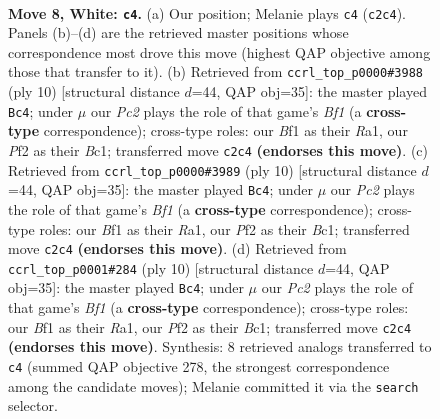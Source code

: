 \documentclass[11pt]{article}
\begin{document}
\begin{figure}[p]\centering
\begin{subfigure}{0.46\textwidth}\centering
\resizebox{\linewidth}{!}{%
\newchessgame
\chessboard[
  setfen={r1b1kbnr/p1ppqppp/2p5/4P3/8/8/PPP1QPPP/RNB1KB1R w KQkq - 3 8},
  showmover=false,
  pgfstyle=straightmove, color=movearrow, markmove={c2-c4}
]}
\caption{}
\end{subfigure}\hfill
\begin{subfigure}{0.46\textwidth}\centering
\resizebox{\linewidth}{!}{%
\newchessgame
\chessboard[
  setfen={rnbqkb1r/pp3ppp/2p2p2/8/3P4/8/PPP2PPP/R1BQKBNR w KQkq - 0 6},
  showmover=false,
  pgfstyle=straightmove, color=movearrow, markmove={f1-c4}
]}
\caption{}
\end{subfigure}
\\[4pt]
\begin{subfigure}{0.46\textwidth}\centering
\resizebox{\linewidth}{!}{%
\newchessgame
\chessboard[
  setfen={rnbqkb1r/pp3ppp/2p2p2/8/3P4/8/PPP2PPP/R1BQKBNR w KQkq - 0 6},
  showmover=false,
  pgfstyle=straightmove, color=movearrow, markmove={f1-c4}
]}
\caption{}
\end{subfigure}\hfill
\begin{subfigure}{0.46\textwidth}\centering
\resizebox{\linewidth}{!}{%
\newchessgame
\chessboard[
  setfen={rnbqkb1r/pp3ppp/2p2p2/8/3P4/8/PPP2PPP/R1BQKBNR w KQkq - 0 6},
  showmover=false,
  pgfstyle=straightmove, color=movearrow, markmove={f1-c4}
]}
\caption{}
\end{subfigure}
\caption{\textbf{Move 8, White: \texttt{c4}.} (a) Our position; Melanie plays \texttt{c4} (\texttt{c2c4}). Panels (b)--(d) are the retrieved master positions whose correspondence most drove this move (highest QAP objective among those that transfer to it). (b) Retrieved from \texttt{ccrl\_top\_p0000\#3988} (ply 10) [structural distance $d$=44, QAP obj=35]: the master played \texttt{Bc4}; under $\mu$ our \emph{Pc2} plays the role of that game's \emph{Bf1} (a \textbf{cross-type} correspondence); cross-type roles: our \emph{B}f1 as their \emph{R}a1, our \emph{P}f2 as their \emph{B}c1; transferred move \texttt{c2c4} \textbf{(endorses this move)}. (c) Retrieved from \texttt{ccrl\_top\_p0000\#3989} (ply 10) [structural distance $d$=44, QAP obj=35]: the master played \texttt{Bc4}; under $\mu$ our \emph{Pc2} plays the role of that game's \emph{Bf1} (a \textbf{cross-type} correspondence); cross-type roles: our \emph{B}f1 as their \emph{R}a1, our \emph{P}f2 as their \emph{B}c1; transferred move \texttt{c2c4} \textbf{(endorses this move)}. (d) Retrieved from \texttt{ccrl\_top\_p0001\#284} (ply 10) [structural distance $d$=44, QAP obj=35]: the master played \texttt{Bc4}; under $\mu$ our \emph{Pc2} plays the role of that game's \emph{Bf1} (a \textbf{cross-type} correspondence); cross-type roles: our \emph{B}f1 as their \emph{R}a1, our \emph{P}f2 as their \emph{B}c1; transferred move \texttt{c2c4} \textbf{(endorses this move)}. Synthesis: 8 retrieved analogs transferred to \texttt{c4} (summed QAP objective 278, the strongest correspondence among the candidate moves); Melanie committed it via the \texttt{search} selector.}
\label{fig:thought-m14}
\end{figure}
\end{document}

